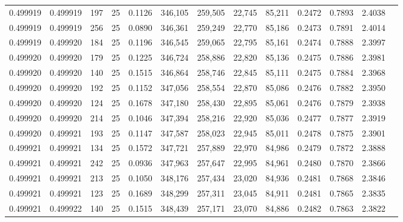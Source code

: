 \begin{tabular}{rrrrrrrrrrrrr}
0.499919 & 0.499919 &   197 &  25 &                                     0.1126 & 346,105 & 259,505 &  22,745 &  85,211 & 0.2472 & 0.7893 & 2.4038 \\
0.499919 & 0.499919 &   256 &  25 &                                     0.0890 & 346,361 & 259,249 &  22,770 &  85,186 & 0.2473 & 0.7891 & 2.4014 \\
0.499919 & 0.499920 &   184 &  25 &                                     0.1196 & 346,545 & 259,065 &  22,795 &  85,161 & 0.2474 & 0.7888 & 2.3997 \\
0.499920 & 0.499920 &   179 &  25 &                                     0.1225 & 346,724 & 258,886 &  22,820 &  85,136 & 0.2475 & 0.7886 & 2.3981 \\
0.499920 & 0.499920 &   140 &  25 &                                     0.1515 & 346,864 & 258,746 &  22,845 &  85,111 & 0.2475 & 0.7884 & 2.3968 \\
0.499920 & 0.499920 &   192 &  25 &                                     0.1152 & 347,056 & 258,554 &  22,870 &  85,086 & 0.2476 & 0.7882 & 2.3950 \\
0.499920 & 0.499920 &   124 &  25 &                                     0.1678 & 347,180 & 258,430 &  22,895 &  85,061 & 0.2476 & 0.7879 & 2.3938 \\
0.499920 & 0.499920 &   214 &  25 &                                     0.1046 & 347,394 & 258,216 &  22,920 &  85,036 & 0.2477 & 0.7877 & 2.3919 \\
0.499920 & 0.499921 &   193 &  25 &                                     0.1147 & 347,587 & 258,023 &  22,945 &  85,011 & 0.2478 & 0.7875 & 2.3901 \\
0.499921 & 0.499921 &   134 &  25 &                                     0.1572 & 347,721 & 257,889 &  22,970 &  84,986 & 0.2479 & 0.7872 & 2.3888 \\
0.499921 & 0.499921 &   242 &  25 &                                     0.0936 & 347,963 & 257,647 &  22,995 &  84,961 & 0.2480 & 0.7870 & 2.3866 \\
0.499921 & 0.499921 &   213 &  25 &                                     0.1050 & 348,176 & 257,434 &  23,020 &  84,936 & 0.2481 & 0.7868 & 2.3846 \\
0.499921 & 0.499921 &   123 &  25 &                                     0.1689 & 348,299 & 257,311 &  23,045 &  84,911 & 0.2481 & 0.7865 & 2.3835 \\
0.499921 & 0.499922 &   140 &  25 &                                     0.1515 & 348,439 & 257,171 &  23,070 &  84,886 & 0.2482 & 0.7863 & 2.3822 \\

\end{tabular}
